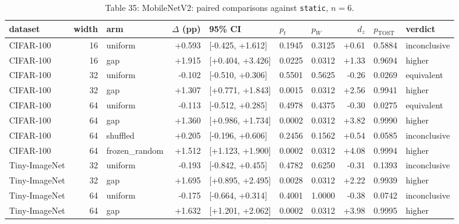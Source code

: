 \documentclass{article}
\begin{document}
\begin{table}
\caption{Table 35: MobileNetV2: paired comparisons against \texttt{static}, $n=6$.}

\begin{tabular}{l r l r l ll r l l}
\toprule
dataset & width & arm & $\Delta$ (pp) & 95\% CI & $p_t$ & $p_W$ & $d_z$ & $p_{\text{TOST}}$ & verdict \\
\midrule
CIFAR‑100 & 16 & uniform & +0.593 & [-0.425, +1.612] & 0.1945 & 0.3125 & +0.61 & 0.5884 & inconclusive \\
CIFAR‑100 & 16 & gap & +1.915 & [+0.404, +3.426] & 0.0225 & 0.0312 & +1.33 & 0.9694 & higher \\
CIFAR‑100 & 32 & uniform & -0.102 & [-0.510, +0.306] & 0.5501 & 0.5625 & -0.26 & 0.0269 & equivalent \\
CIFAR‑100 & 32 & gap & +1.307 & [+0.771, +1.843] & 0.0015 & 0.0312 & +2.56 & 0.9941 & higher \\
CIFAR‑100 & 64 & uniform & -0.113 & [-0.512, +0.285] & 0.4978 & 0.4375 & -0.30 & 0.0275 & equivalent \\
CIFAR‑100 & 64 & gap & +1.360 & [+0.986, +1.734] & 0.0002 & 0.0312 & +3.82 & 0.9990 & higher \\
CIFAR‑100 & 64 & shuffled & +0.205 & [-0.196, +0.606] & 0.2456 & 0.1562 & +0.54 & 0.0585 & inconclusive \\
CIFAR‑100 & 64 & frozen\_random & +1.512 & [+1.123, +1.900] & 0.0002 & 0.0312 & +4.08 & 0.9994 & higher \\
Tiny‑ImageNet & 32 & uniform & -0.193 & [-0.842, +0.455] & 0.4782 & 0.6250 & -0.31 & 0.1393 & inconclusive \\
Tiny‑ImageNet & 32 & gap & +1.695 & [+0.895, +2.495] & 0.0028 & 0.0312 & +2.22 & 0.9939 & higher \\
Tiny‑ImageNet & 64 & uniform & -0.175 & [-0.664, +0.314] & 0.4001 & 1.0000 & -0.38 & 0.0742 & inconclusive \\
Tiny‑ImageNet & 64 & gap & +1.632 & [+1.201, +2.062] & 0.0002 & 0.0312 & +3.98 & 0.9995 & higher \\
\bottomrule
\end{tabular}
\end{table}
\end{document}
